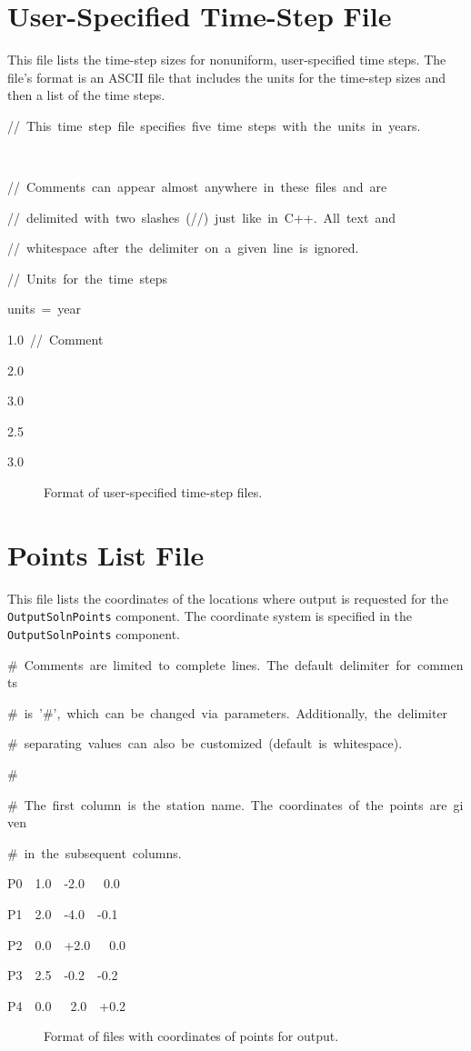 \section{User-Specified Time-Step File}
\label{sec:format:TimeStepUser}

This file lists the time-step sizes for nonuniform, user-specified
time steps. The file's format is an ASCII file that includes the units
for the time-step sizes and then a list of the time steps. 
\begin{lyxcode}
//~This~time~step~file~specifies~five~time~steps~with~the~units~in~years.

~

//~Comments~can~appear~almost~anywhere~in~these~files~and~are

//~delimited~with~two~slashes~(//)~just~like~in~C++.~All~text~and~

//~whitespace~after~the~delimiter~on~a~given~line~is~ignored.



//~Units~for~the~time~steps

units~=~year



1.0~//~Comment

2.0

3.0

2.5

3.0
\end{lyxcode}
\begin{figure}[H]
\caption{Format of user-specified time-step files.}
\end{figure}



\section{\label{sec:format:PointsList}Points List File}

This file lists the coordinates of the locations where output is requested
for the \texttt{OutputSolnPoints} component. The coordinate system
is specified in the \texttt{OutputSolnPoints} component. 
\begin{lyxcode}
\#~Comments~are~limited~to~complete~lines.~The~default~delimiter~for~comments

\#~is~'\#',~which~can~be~changed~via~parameters.~Additionally,~the~delimiter~

\#~separating~values~can~also~be~customized~(default~is~whitespace).

\#

\#~The~first~column~is~the~station~name.~The~coordinates~of~the~points~are~given

\#~in~the~subsequent~columns.

P0~~1.0~~-2.0~~~0.0

P1~~2.0~~-4.0~~-0.1

P2~~0.0~~+2.0~~~0.0

P3~~2.5~~-0.2~~-0.2~

P4~~0.0~~~2.0~~+0.2
\end{lyxcode}
\begin{figure}[H]
\caption{Format of files with coordinates of points for output.}
\end{figure}

